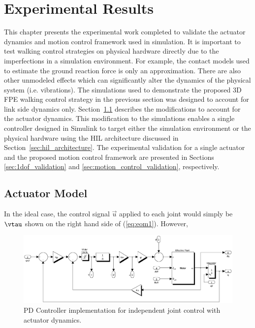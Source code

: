 \chapter{Experimental Results} %
\label{cha:experiments}

This chapter presents the experimental work completed to validate the actuator dynamics and motion control framework used in simulation. It is important to test walking control strategies on physical hardware directly due to the imperfections in a simulation environment. For example, the contact models used to estimate the ground reaction force is only an approximation. There are also other unmodeled effects which can significantly alter the dynamics of the physical system (i.e. vibrations). The simulations used to demonstrate the proposed 3D FPE walking control strategy in the previous section was designed to account for link side dynamics only. Section~\ref{sec:actuator_model} describes the modifications to account for the actuator dynamics. This modification to the simulations enables a single controller designed in Simulink to target either the simulation environment or the physical hardware using the HIL architecture discussed in Section~\ref{sec:hil_architecture}. The experimental validation for a single actuator and the proposed motion control framework are presented in Sections \ref{sec:1dof_validation} and \ref{sec:motion_control_validation}, respectively. 

\section{Actuator Model} %
\label{sec:actuator_model}
In the ideal case, the control signal $\vec{u}$ applied to each joint would simply be $\vtau$ shown on the right hand side of (\ref{eq:eom1}). However, 

\begin{figure}[!h]
	\centering
    \includegraphics[scale=0.5]{fig/experiments/pdmotorcontroller.eps} 
  	\caption{PD Controller implementation for independent joint control with actuator dynamics.}
	\label{fig:pdmotorcontroller}
\end{figure}

